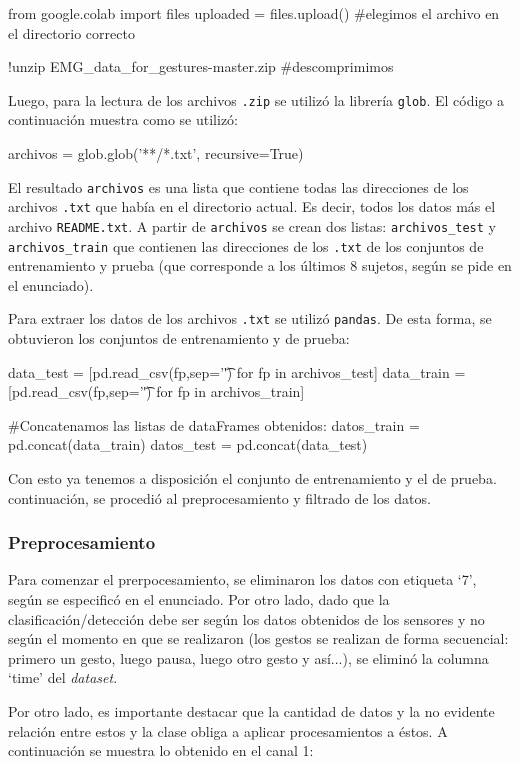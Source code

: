 \begin{python}
from google.colab import files
uploaded = files.upload() #elegimos el archivo en el directorio correcto

!unzip EMG_data_for_gestures-master.zip #descomprimimos
\end{python}

Luego, para la lectura de los archivos \texttt{.zip} se utilizó la librería \texttt{glob}. El código a continuación muestra como se utilizó:

\begin{python}
archivos = glob.glob('**/*.txt', recursive=True)
\end{python}

El resultado \texttt{archivos} es una lista que contiene todas las direcciones de los archivos \texttt{.txt} que había en el directorio actual. Es decir, todos los datos más el archivo \texttt{README.txt}. A partir de \texttt{archivos} se crean dos listas: \texttt{archivos\_test} y \texttt{archivos\_train} que contienen las direcciones de los \texttt{.txt} de los conjuntos de entrenamiento y prueba (que corresponde a los últimos 8 sujetos, según se pide en el enunciado). 
\par Para extraer los datos de los archivos \texttt{.txt} se utilizó \texttt{pandas}. De esta forma, se obtuvieron los conjuntos de entrenamiento y de prueba:

\begin{python}
data_test = [pd.read_csv(fp,sep='\t') for fp in archivos_test]
data_train = [pd.read_csv(fp,sep='\t') for fp in archivos_train]

#Concatenamos las listas de dataFrames obtenidos:
datos_train = pd.concat(data_train)
datos_test = pd.concat(data_test)
\end{python}

Con esto ya tenemos a disposición el conjunto de entrenamiento y el de prueba.  continuación, se procedió al preprocesamiento y filtrado de los datos.

\subsubsection{Preprocesamiento}
Para comenzar el prerpocesamiento, se eliminaron los datos con etiqueta `7', según se especificó en el enunciado. Por otro lado, dado que la clasificación/detección debe ser según los datos obtenidos de los sensores y no según el momento en que se realizaron (los gestos se realizan de forma secuencial: primero un gesto, luego pausa, luego otro gesto y así...), se eliminó la columna `time' del \textit{dataset}. 
\par Por otro lado, es importante destacar que la cantidad de datos y la no evidente relación entre estos y la clase obliga a aplicar procesamientos a éstos. A continuación se muestra lo obtenido en el canal 1:


